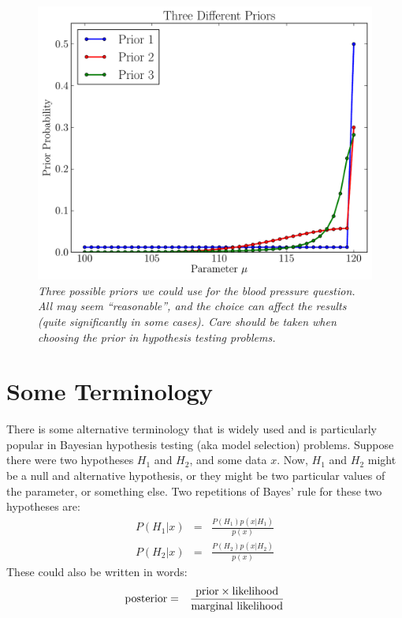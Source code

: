 \begin{figure}[ht!]
\begin{center}
\includegraphics[scale=0.6]{Figures/testing_priors.pdf}
\caption{\it Three possible priors we could use for the blood pressure question.
All may seem ``reasonable'', and the choice can affect the results (quite
significantly in some cases). Care should be taken when choosing the prior
in hypothesis testing problems.
\label{fig:testing_priors}}
\end{center}
\end{figure}


\section{Some Terminology}
There is some alternative terminology that is widely used and is particularly
popular in Bayesian hypothesis testing (aka model selection) problems. Suppose
there were two hypotheses $H_1$ and $H_2$, and some data $x$. Now, $H_1$ and
$H_2$ might be a null and alternative hypothesis, or they might be two
particular values of the parameter, or something else. Two repetitions of Bayes' rule
for these two hypotheses are:
\begin{eqnarray}
P(H_1 | x) &=& \frac{P(H_1)p(x|H_1)}{p(x)}\\
P(H_2 | x) &=& \frac{P(H_2)p(x|H_2)}{p(x)}
\end{eqnarray}
These could also be written in words:
\begin{eqnarray}
\textnormal{posterior} &=& \frac{\textnormal{prior}\times\textnormal{likelihood}}{\textnormal{marginal likelihood}}
\end{eqnarray}

